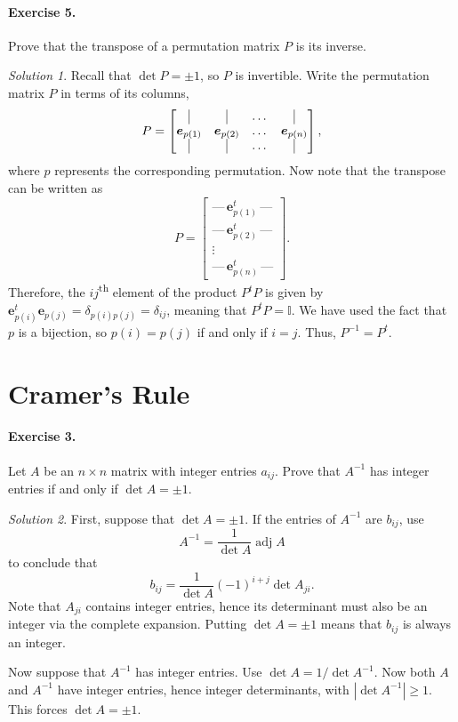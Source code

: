 \documentclass[11pt]{report}
\renewcommand\vec\boldsymbol
\def\ve{\vec{e}}
\theoremstyle{remark}
\newtheorem*{solution}{Solution}
\begin{document}
    \paragraph{Exercise 5.} Prove that the transpose of a permutation matrix $P$ is
    its inverse.
    \begin{solution}
        Recall that $\det{P} = \pm 1$, so $P$ is invertible.
        Write the permutation matrix $P$ in terms of its columns, \[
            P = \begin{bmatrix}
                \vline & \vline & \dots & \vline \\
                \ve_{p(1)} & \ve_{p(2)} & \dots & \ve_{p(n)} \\
                \vline & \vline & \dots & \vline 
            \end{bmatrix},
        \] where $p$ represents the corresponding permutation.
        Now note that the transpose can be written as \[
            P = \begin{bmatrix}
                \text{---}\, \ve_{p(1)}^t\,\text{---} \\
                \text{---}\, \ve_{p(2)}^t\,\text{---} \\
                \vdots \\ 
                \text{---}\, \ve_{p(n)}^t\,\text{---} 
            \end{bmatrix}.
        \] Therefore, the $ij$\textsuperscript{th} element of the product $P^tP$ is
        given by $\ve_{p(i)}^t \ve_{p(j)} = \delta_{p(i)p(j)} = \delta_{ij}$,
        meaning that $P^tP = \mathbb{I}$. We have used the fact that $p$ is a
        bijection, so $p(i) = p(j)$ if and only if $i = j$. Thus, $P^{-1} = P^t$.
    \end{solution}

    \section{Cramer's Rule}

    \paragraph{Exercise 3.} Let $A$ be an $n\times n$ matrix with integer entries
    $a_{ij}$. Prove that $A^{-1}$ has integer entries if and only if $\det{A} = \pm
    1$.
    \begin{solution}
        First, suppose that $\det{A} = \pm 1$. If the entries of $A^{-1}$ are
        $b_{ij}$, use \[
            A^{-1} = \frac{1}{\det{A}} \operatorname{adj}{A}
        \] to conclude that \[
            b_{ij} = \frac{1}{\det{A}} (-1)^{i + j} \det A_{ji}.
        \] Note that $A_{ji}$ contains integer entries, hence its determinant must
        also be an integer via the complete expansion. Putting $\det{A} = \pm 1$
        means that $b_{ij}$ is always an integer.

        Now suppose that $A^{-1}$ has integer entries. Use $\det{A} = 1 /
        \det{A}^{-1}$. Now both $A$ and $A^{-1}$ have integer entries, hence integer
        determinants, with $|\det{A^{-1}}| \geq 1$. This forces $\det{A} = \pm 1$.
    \end{solution}
\end{document}
